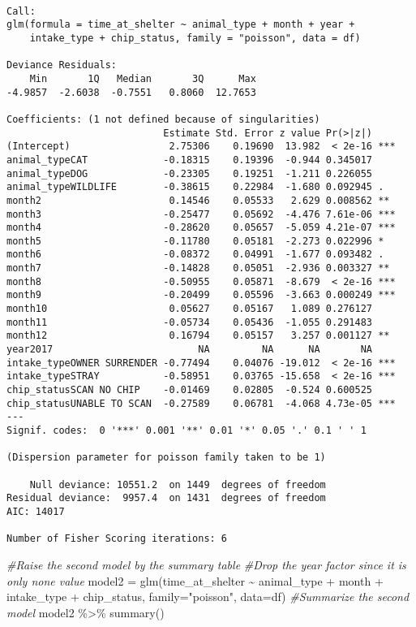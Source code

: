 \documentclass[
]{article}
\newenvironment{Shaded}{\begin{snugshade}}{\end{snugshade}}
\newcommand{\AttributeTok}[1]{\textcolor[rgb]{0.77,0.63,0.00}{#1}}
\newcommand{\CommentTok}[1]{\textcolor[rgb]{0.56,0.35,0.01}{\textit{#1}}}
\newcommand{\FunctionTok}[1]{\textcolor[rgb]{0.00,0.00,0.00}{#1}}
\newcommand{\NormalTok}[1]{#1}
\newcommand{\OtherTok}[1]{\textcolor[rgb]{0.56,0.35,0.01}{#1}}
\newcommand{\SpecialCharTok}[1]{\textcolor[rgb]{0.00,0.00,0.00}{#1}}
\newcommand{\StringTok}[1]{\textcolor[rgb]{0.31,0.60,0.02}{#1}}
\begin{document}
\begin{verbatim}

Call:
glm(formula = time_at_shelter ~ animal_type + month + year + 
    intake_type + chip_status, family = "poisson", data = df)

Deviance Residuals: 
    Min       1Q   Median       3Q      Max  
-4.9857  -2.6038  -0.7551   0.8060  12.7653  

Coefficients: (1 not defined because of singularities)
                           Estimate Std. Error z value Pr(>|z|)    
(Intercept)                 2.75306    0.19690  13.982  < 2e-16 ***
animal_typeCAT             -0.18315    0.19396  -0.944 0.345017    
animal_typeDOG             -0.23305    0.19251  -1.211 0.226055    
animal_typeWILDLIFE        -0.38615    0.22984  -1.680 0.092945 .  
month2                      0.14546    0.05533   2.629 0.008562 ** 
month3                     -0.25477    0.05692  -4.476 7.61e-06 ***
month4                     -0.28620    0.05657  -5.059 4.21e-07 ***
month5                     -0.11780    0.05181  -2.273 0.022996 *  
month6                     -0.08372    0.04991  -1.677 0.093482 .  
month7                     -0.14828    0.05051  -2.936 0.003327 ** 
month8                     -0.50955    0.05871  -8.679  < 2e-16 ***
month9                     -0.20499    0.05596  -3.663 0.000249 ***
month10                     0.05627    0.05167   1.089 0.276127    
month11                    -0.05734    0.05436  -1.055 0.291483    
month12                     0.16794    0.05157   3.257 0.001127 ** 
year2017                         NA         NA      NA       NA    
intake_typeOWNER SURRENDER -0.77494    0.04076 -19.012  < 2e-16 ***
intake_typeSTRAY           -0.58951    0.03765 -15.658  < 2e-16 ***
chip_statusSCAN NO CHIP    -0.01469    0.02805  -0.524 0.600525    
chip_statusUNABLE TO SCAN  -0.27589    0.06781  -4.068 4.73e-05 ***
---
Signif. codes:  0 '***' 0.001 '**' 0.01 '*' 0.05 '.' 0.1 ' ' 1

(Dispersion parameter for poisson family taken to be 1)

    Null deviance: 10551.2  on 1449  degrees of freedom
Residual deviance:  9957.4  on 1431  degrees of freedom
AIC: 14017

Number of Fisher Scoring iterations: 6
\end{verbatim}

\begin{Shaded}
\begin{Highlighting}[]
\CommentTok{\#Raise the second model by the summary table}
\CommentTok{\#Drop the year factor since it is only none value}
\NormalTok{model2 }\OtherTok{=} \FunctionTok{glm}\NormalTok{(time\_at\_shelter }\SpecialCharTok{\textasciitilde{}}\NormalTok{ animal\_type }\SpecialCharTok{+}\NormalTok{ month }\SpecialCharTok{+}\NormalTok{ intake\_type }\SpecialCharTok{+}\NormalTok{ chip\_status, }\AttributeTok{family=}\StringTok{"poisson"}\NormalTok{, }\AttributeTok{data=}\NormalTok{df)}
\CommentTok{\#Summarize the second model}
\NormalTok{model2 }\SpecialCharTok{\%\textgreater{}\%}
  \FunctionTok{summary}\NormalTok{()}
\end{Highlighting}
\end{Shaded}
\end{document}
